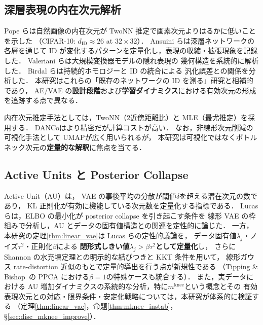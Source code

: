 \documentclass[11pt,a4paper]{jsarticle}
\newcommand{\mknee}{m^{\mathrm{knee}}}
\begin{document}
\subsection{深層表現の内在次元解析}\label{sec:related_id}

Pope ら\cite{pope2021intrinsic}は自然画像の内在次元が
TwoNN 推定で画素次元よりはるかに低いことを示した
（CIFAR-10: $d_\mathrm{ID} \approx 26$ at $32 \times 32$）．
Ansuini ら\cite{ansuini2019intrinsic}は深層ネットワークの各層を通じて
ID が変化するパターンを定量化し，表現の収縮・拡張現象を記録した．
Valeriani ら\cite{valeriani2023geometry}は大規模変換器モデルの隠れ表現の
幾何構造を系統的に解析した．
Birdal ら\cite{birdal2021intrinsic}は持続的ホモロジーと ID の統合による
汎化誤差との関係を分析した．
本研究はこれらの「既存のネットワークの ID を測る」研究と相補的であり，
AE/VAE の\textbf{設計段階}および\textbf{学習ダイナミクス}における有効次元の形成を追跡する点で異なる．

内在次元推定手法としては，TwoNN\cite{facco2017twonn}（2近傍距離比）と
MLE\cite{levina2005mle}（最尤推定）を採用する．
DANCo\cite{ceruti2014danco}はより精密だが計算コストが高い．
なお，非線形次元削減の可視化手法として UMAP\cite{mcinnes2018umap}が広く用いられるが，
本研究は可視化ではなくボトルネック次元の\textbf{定量的な解釈}に焦点を当てる．

\subsection{Active Units と Posterior Collapse}\label{sec:related_au}

Active Unit（AU）\cite{lucas2019elbo,higgins2017betavae}は，
VAE の事後平均の分散が閾値$\delta$を超える潜在次元の数であり，
KL 正則化が有効に機能している次元数を定量化する指標である．
Lucas ら\cite{lucas2019elbo}は，ELBO の最小化が posterior collapse を引き起こす条件を
線形 VAE の枠組みで分析し，AU とデータの固有値構造との関連を定性的に論じた．
一方，本研究の定理\ref{thm:linear_vae}は Lucas らの定性的議論を，
データ固有値$\lambda_j$・ノイズ$\tau^2$・正則化$\beta$による
\textbf{閉形式しきい値$\lambda_j > \beta\tau^2$として定量化}し，
さらに Shannon の水充填定理との明示的な結びつきと KKT 条件を用いて，
線形ガウス rate-distortion 近似のもとで定量的導出を行う点が新規性である
（Tipping \& Bishop~\cite{tippingbishop1999ppca}の PPCA における$\beta=1$の特殊ケースも統合する）．
また，実データにおける AU 増加ダイナミクスの系統的な分析，特に$\mknee$という概念とその
有効表現次元との対応・限界条件・安定化戦略については，本研究が体系的に検証する
（定理\ref{thm:linear_vae}，命題\ref{thm:mknee_instab}，§\ref{sec:disc_mknee_improve}）．
\end{document}
